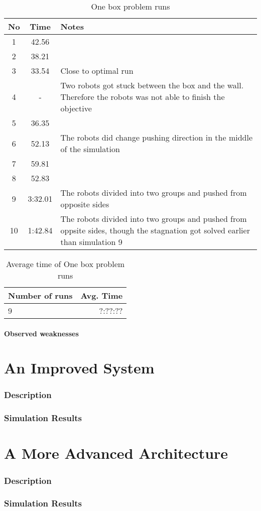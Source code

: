 \documentclass{article}
\begin{document}
\begin{table}[h!]
\centering
\begin{tabular}{ c | c | p{5cm}}
\hline No & Time & Notes \\ \hline
 1 & 42.56 &  \\ \hline
 2 & 38.21 & \\ \hline
 3 & 33.54 & Close to optimal run \\ \hline
4 & - & Two robots got stuck between the box and the wall. Therefore the robots was not able to finish the objective \\ \hline
5 & 36.35 & \\ \hline
6	& 52.13 & The robots did change pushing direction in the middle of the simulation \\ \hline
7 & 59.81 & \\ \hline
8 & 52.83 & \\ \hline
9 & 3:32.01 &  The robots divided into two groups and pushed from opposite sides \\ \hline
10 & 1:42.84 & The robots divided into two groups and pushed from oppsite sides, though the stagnation got solved earlier than simulation 9 \\
\end{tabular}
\caption{One box problem runs}
\end{table}


\begin{table}
\centering
\begin{tabular}{ l | r}
\hline Number of runs & Avg. Time \\ \hline
9 & ?:??:?? \\
\end{tabular}
\caption{ Average time of One box problem runs}
\end{table}


\subsection{Observed weaknesses}
\part{An Improved System}

\section{Description}
\section{Simulation Results}
\part{A More Advanced Architecture}

\section{Description}
\section{Simulation Results}



\end{document}
